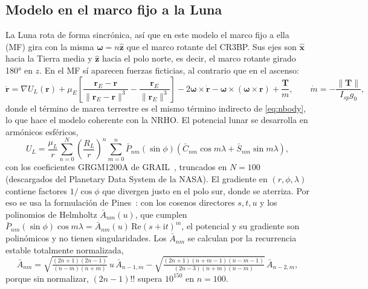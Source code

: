 \documentclass[11pt,a4paper]{article}
\newcommand{\vect}[1]{\mathbf{#1}}
\newcommand{\uvec}[1]{\hat{\mathbf{#1}}}
\begin{document}
\subsection{Modelo en el marco fijo a la Luna}
La Luna rota de forma sincrónica, así que en este modelo el marco fijo a ella (MF) gira con la misma $\vect\omega=n\uvec z$ que el marco rotante del CR3BP. Sus ejes son $\uvec x$ hacia la Tierra media y $\uvec z$ hacia el polo norte, es decir, el marco rotante girado \ang{180} en $z$. En el MF sí aparecen fuerzas ficticias, al contrario que en el ascenso:
\begin{equation}
\ddot{\vect r}=\nabla U_L(\vect r)+\mu_E\!\left[\frac{\vect r_E-\vect r}{\|\vect r_E-\vect r\|^3}-\frac{\vect r_E}{\|\vect r_E\|^3}\right]-2\vect\omega\times\dot{\vect r}-\vect\omega\times(\vect\omega\times\vect r)+\frac{\vect T}{m},
\qquad \dot m=-\frac{\|\vect T\|}{I_{sp}g_0},
\label{eq:descent}
\end{equation}
donde el término de marea terrestre es el mismo término indirecto de \eqref{eq:nbody}, lo que hace el modelo coherente con la NRHO. El potencial lunar se desarrolla en armónicos esféricos,
\begin{equation}
U_L=\frac{\mu_L}{r}\sum_{n=0}^{N}\left(\frac{R_L}{r}\right)^n\sum_{m=0}^{n}\bar P_{nm}(\sin\phi)\left(\bar C_{nm}\cos m\lambda+\bar S_{nm}\sin m\lambda\right),
\end{equation}
con los coeficientes GRGM1200A de GRAIL~\cite{zuber2013,goossens2016}, truncados en $N=100$ (descargados del Planetary Data System de la NASA). El gradiente en $(r,\phi,\lambda)$ contiene factores $1/\cos\phi$ que divergen justo en el polo sur, donde se aterriza. Por eso se usa la formulación de Pines~\cite{pines1973}: con los cosenos directores $s,t,u$ y los polinomios de Helmholtz $\bar A_{nm}(u)$, que cumplen $\bar P_{nm}(\sin\phi)\cos m\lambda=\bar A_{nm}(u)\,\mathrm{Re}(s+\mathrm i t)^m$, el potencial y su gradiente son polinómicos y no tienen singularidades. Los $\bar A_{nm}$ se calculan por la recurrencia estable totalmente normalizada,
\begin{equation}
\bar A_{nm}=\sqrt{\tfrac{(2n+1)(2n-1)}{(n-m)(n+m)}}\,u\,\bar A_{n-1,m}-\sqrt{\tfrac{(2n+1)(n+m-1)(n-m-1)}{(2n-3)(n+m)(n-m)}}\,\bar A_{n-2,m},
\end{equation}
porque sin normalizar, $(2n-1)!!$ supera $10^{150}$ en $n=100$.
\end{document}
